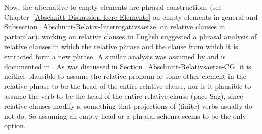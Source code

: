Now, the alternative to empty elements are phrasal constructions (see
Chapter~\ref{Abschnitt-Diskussion-leere-Elemente} on empty elements in general and
Subsection~\ref{Abschnitt-Relativ-Interrogativsaetze} on relative clauses in particular). \cite{Sag97a} working on relative clauses in
English suggested a phrasal analysis of relative clauses in which the relative phrase and the clause
from which it is extracted form a new phrase. A similar analysis was assumed by
\citet{Babel} and is documented in . As was discussed in Section~\ref{Abschnitt-Relativsaetze-CG} it is
neither plausible to assume the relative pronoun or some other element in the relative phrase to be the
head of the entire relative clause, nor is it plausible to assume the verb to be the head of the entire
relative clause (pace Sag), since relative clauses modify \nbar{}s, something that projections
of (finite) verbs usually do not do. 
So assuming an empty head or a phrasal schema seems to be the
only option.

